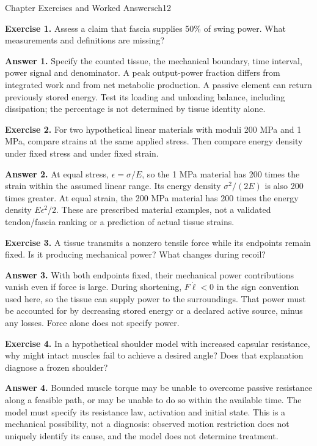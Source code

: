 \begin{exercises}{Chapter Exercises and Worked Answers}{ch12}

\textbf{Exercise 1.} Assess a claim that fascia supplies 50\% of swing power. What measurements and definitions are missing?

\textbf{Answer 1.} Specify the counted tissue, the mechanical boundary, time interval, power signal and denominator. A peak output-power fraction differs from integrated work and from net metabolic production. A passive element can return previously stored energy. Test its loading and unloading balance, including dissipation; the percentage is not determined by tissue identity alone.

\textbf{Exercise 2.} For two hypothetical linear materials with moduli 200 MPa and 1 MPa, compare strains at the same applied stress. Then compare energy density under fixed stress and under fixed strain.

\textbf{Answer 2.} At equal stress, $\epsilon=\sigma/E$, so the 1 MPa material has 200 times the strain within the assumed linear range. Its energy density $\sigma^2/(2E)$ is also 200 times greater. At equal strain, the 200 MPa material has 200 times the energy density $E\epsilon^2/2$. These are prescribed material examples, not a validated tendon/fascia ranking or a prediction of actual tissue strains.

\textbf{Exercise 3.} A tissue transmits a nonzero tensile force while its endpoints remain fixed. Is it producing mechanical power? What changes during recoil?

\textbf{Answer 3.} With both endpoints fixed, their mechanical power contributions vanish even if force is large. During shortening, $F\dot\ell<0$ in the sign convention used here, so the tissue can supply power to the surroundings. That power must be accounted for by decreasing stored energy or a declared active source, minus any losses. Force alone does not specify power.

\textbf{Exercise 4.} In a hypothetical shoulder model with increased capsular resistance, why might intact muscles fail to achieve a desired angle? Does that explanation diagnose a frozen shoulder?

\textbf{Answer 4.} Bounded muscle torque may be unable to overcome passive resistance along a feasible path, or may be unable to do so within the available time. The model must specify its resistance law, activation and initial state. This is a mechanical possibility, not a diagnosis: observed motion restriction does not uniquely identify its cause, and the model does not determine treatment.


\end{exercises}
